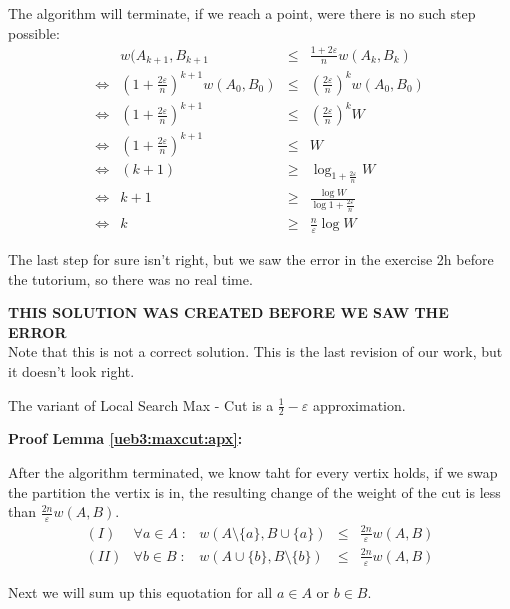 The algorithm will terminate, if we reach a point, were there is no such step possible:
$$\begin{array}{crcl}
& w(A_{k+1},B_{k+1} & \leq & \frac{1+ 2\varepsilon}{n} w(A_k,B_k)\\
\Leftrightarrow & (1 + \frac{2\varepsilon}{n} )^{k+1} w(A_0,B_0) &\leq & (\frac{2\varepsilon}{n})^k w(A_0,B_0)\\
\Leftrightarrow & \left(1 + \frac{2\varepsilon}{n}\right)^{k+1} & \leq & \left( \frac{2\varepsilon}{n}\right)^k W\\
\Leftrightarrow & \left(1 + \frac{2\varepsilon}{n} \right)^{k+1} & \leq & W\\
\Leftrightarrow & (k+1) &\geq& \log_{1 + \frac{2\varepsilon}{n}} W\\
\Leftrightarrow & k+1 & \geq & \frac{\log W}{\log 1 + \frac{2\varepsilon}{n}}\\
\Leftrightarrow & k & \geq & \frac{n}{\varepsilon} \log W
\end{array}$$

The last step for sure isn't right, but we saw the error in the exercise 2h before the tutorium, so there was no real time.

\textbf{THIS SOLUTION WAS CREATED BEFORE WE SAW THE ERROR}\\
Note that this is not a correct solution. This is the last revision of our work, but it doesn't look right.\\

\begin{lemma}\label{ueb3:maxcut:apx}
{\mdseries
The variant of Local Search Max - Cut is a $\frac{1}{2} - \varepsilon$ approximation.
}
\end{lemma}
\textbf{Proof Lemma \ref{ueb3:maxcut:apx}:}

After the algorithm terminated, we know taht for every vertix holds, if we swap the partition the vertix is in, the resulting change of the weight of the cut is less than $\frac{2n}{\varepsilon}w(A,B)$.\\

$$\begin{array}{ccrcl}
(I) & \forall a \in A \; : & w(A\setminus\{a\}, B \cup \{a\}) & \leq & \frac{2n}{\varepsilon}w(A,B)\\
(II) & \forall b \in B \; : & w(A \cup \{b\} , B \setminus \{b\}) & \leq & \frac{2n}{\varepsilon}w(A,B)
\end{array}$$

Next we will sum up this equotation for all $a \in A$ or $b \in B$.\\

